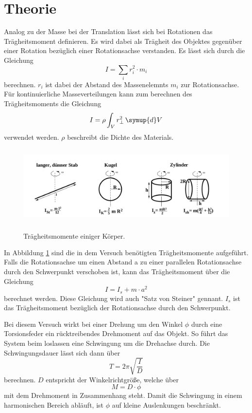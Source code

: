 \section{Theorie}
\label{sec:Theorie}
Analog zu der Masse bei der Translation lässt sich bei Rotationen das Trägheitsmoment definieren. Es wird dabei als Trägheit des Objektes gegenüber einer Rotation bezüglich einer Rotationsachse verstanden. Es lässt sich durch die Gleichung 
\begin{equation}
    I=\sum_{i}r_i^2\cdot m_i
\end{equation}
berechnen. $r_i$ ist dabei der Abstand des Massenelemnts $m_i$ zur Rotationsachse.
Für kontinuierliche Masseverteilungen kann zum berechnen des Trägheitsmoments die Gleichung
\begin{equation}
    I=\rho\int_V r_\perp^2 \,\symup{d}V
\end{equation}
verwendet werden. $\rho$ beschreibt die Dichte des Materials.


\begin{figure}
    \caption{Trägheitsmomente einiger Körper.}
    \centering
    \includegraphics[height=4cm]{data/Probekoerper.png}
    \label{fig:probe}
\end{figure}


In Abbildung \ref{fig:probe} sind die in dem Versuch benötigten Trägheitsmomente aufgeführt. 
Falls die Rotationsachse um einen Abstand a zu einer parallelen Rotationsachse durch den Schwerpunkt verschoben ist, kann das Trägheitsmoment über die Gleichung
\begin{equation}
    I=I_s+m\cdot a^2
\end{equation}
berechnet werden. Diese Gleichung wird auch "Satz von Steiner" gennant.  $I_s$ ist das Trägheitsmoment bezüglich der Rotationsachse durch den Schwerpunkt.


Bei diesem Versuch wirkt bei einer Drehung um den Winkel $\phi$ durch eine Torsionsfeder ein rücktreibendes Drehmoment auf das Objekt. So führt das System beim loslassen eine Schwingung um die Drehachse durch. Die Schwingungsdauer lässt sich dann über 
\begin{equation}
\label{eqn:T}
    T=2\pi \sqrt{\frac{I}{D}}
\end{equation}
berechnen. $D$ entspricht der Winkelrichtgröße, welche über  
\begin{equation}
\label{eqn:M}
    M=D\cdot \phi
\end{equation}
mit dem Drehmoment in Zusammenhang steht.
Damit die Schwingung in einem harmonischen Bereich abläuft, ist $\phi$ auf kleine Auslenkungen beschränkt.

